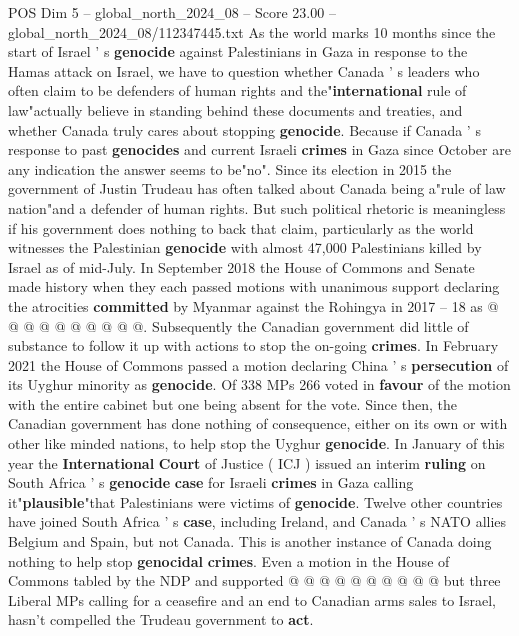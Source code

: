 \begin{textsample}{POS Dim 5 – global\_north\_2024\_08 – Score 23.00 – global\_north\_2024\_08/112347445.txt}  \label{ex:f5_pos_371}
As the world marks 10 months since the start of Israel ' s \textbf{genocide} against Palestinians in Gaza in response to the Hamas attack on Israel, we have to question whether Canada ' s leaders who often claim to be defenders of human rights and the"\textbf{international} rule of law"actually believe in standing behind these documents and treaties, and whether Canada truly cares about stopping \textbf{genocide}.
Because if Canada ' s response to past \textbf{genocides} and current Israeli \textbf{crimes} in Gaza since October are any indication the answer seems to be"no".
Since its election in 2015 the government of Justin Trudeau has often talked about Canada being a"rule of law nation"and a defender of human rights.
But such political rhetoric is meaningless if his government does nothing to back that claim, particularly as the world witnesses the Palestinian \textbf{genocide} with almost 47,000 Palestinians killed by Israel as of mid-July.
In September 2018 the House of Commons and Senate made history when they each passed motions with unanimous support declaring the atrocities \textbf{committed} by Myanmar against the Rohingya in 2017 -- 18 as @ @ @ @ @ @ @ @ @ @.
Subsequently the Canadian government did little of substance to follow it up with actions to stop the on-going \textbf{crimes}.
In February 2021 the House of Commons passed a motion declaring China ' s \textbf{persecution} of its Uyghur minority as \textbf{genocide}.
Of 338 MPs 266 voted in \textbf{favour} of the motion with the entire cabinet but one being absent for the vote.
Since then, the Canadian government has done nothing of consequence, either on its own or with other like minded nations, to help stop the Uyghur \textbf{genocide}.
In January of this year the \textbf{International} \textbf{Court} of Justice ( ICJ ) issued an interim \textbf{ruling} on South Africa ' s \textbf{genocide} \textbf{case} for Israeli \textbf{crimes} in Gaza calling it"\textbf{plausible}"that Palestinians were victims of \textbf{genocide}.
Twelve other countries have joined South Africa ' s \textbf{case}, including Ireland, and Canada ' s NATO allies Belgium and Spain, but not Canada.
This is another instance of Canada doing nothing to help stop \textbf{genocidal} \textbf{crimes}.
Even a motion in the House of Commons tabled by the NDP and supported @ @ @ @ @ @ @ @ @ @ but three Liberal MPs calling for a ceasefire and an end to Canadian arms sales to Israel, hasn't compelled the Trudeau government to \textbf{act}.

\end{textsample}
